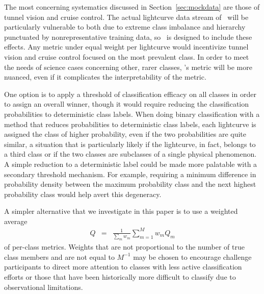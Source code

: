 The most concerning systematics discussed in Section~\ref{sec:mockdata} are those of tunnel vision and cruise control.
The actual lightcurve data stream of \lsst\ will be particularly vulnerable to both due to extreme class imbalance and hierarchy punctuated by nonrepresentative training data, so \plasticc\ is designed to include these effects.
Any metric under equal weight per lightcurve would incentivize tunnel vision and cruise control focused on the most prevalent class.
In order to meet the needs of science cases concerning other, rarer classes, \plasticc's metric will be more nuanced, even if it complicates the interpretability of the metric.

One option is to apply a threshold of classification efficacy on all classes in order to assign an overall winner, though it would require reducing the classification probabilities to deterministic class labels.
When doing binary classification with a method that reduces probabilities to deterministic class labels, each lightcurve is assigned the class of higher probability, even if the two probabilities are quite similar, a situation that is particularly likely if the lightcurve, in fact, belongs to a third class or if the two classes are subclasses of a single physical phenomenon.
A simple reduction to a deterministic label could be made more palatable with a secondary threshold mechanism.
For example, requiring a minimum difference in probability density between the maximum probability class and the next highest probability class would help avert this degeneracy.

A simpler alternative that we investigate in this paper is to use a weighted average
\begin{eqnarray}
  \label{eq:weightavg}
  Q &=& \frac{1}{\sum_{m} w_{m}} \sum_{m=1}^{M} w_{m} Q_{m}
\end{eqnarray}
of per-class metrics.
Weights that are not proportional to the number of true class members and are not equal to $M^{-1}$ may be chosen to encourage challenge participants to direct more attention to classes with less active classification efforts or those that have been historically more difficult to classify due to observational limitations.

